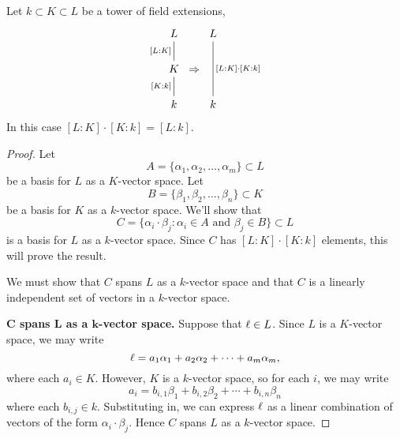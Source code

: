 \documentclass{ximera}
\begin{document}
\begin{lemma}\label{L:dm}
  Let $k\subset K\subset L$ be a tower of field extensions,
  \[
  \begin{tikzcd}[column sep=0pt]
    L\ar[d,-,"{[L:K]}",swap]  &             &  L\ar[dd,-,"{[L:K]\cdot [K:k]}"]   \\
    K \ar[d,-,"{[K:k]}",swap] & \Rightarrow &     \\
    k                         &             &  k
  \end{tikzcd}
  \]
  In this case $[L:K]\cdot [K:k] = [L:k]$.
  \begin{proof}
    Let
    \[
    A = \{\alpha_1,\alpha_2,\dots,\alpha_m\}\subset L
    \]
    be a basis for $L$ as a $K$-vector space. Let
    \[
    B = \{\beta_1,\beta_2,\dots,\beta_n\}\subset K
    \]
    be a basis for $K$ as a $k$-vector space. We'll show that
    \[
    C = \{\alpha_i\cdot \beta_j:\alpha_i\in A \text{ and }\beta_j\in B\} \subset L
    \]
    is a basis for $L$ as a $k$-vector space. Since $C$ has
    $[L:K]\cdot [K:k]$ elements, this will prove the result.

    We must show that $C$ spans $L$ as a $k$-vector space and that $C$
    is a linearly independent set of vectors in a $k$-vector space.

    \textbf{$\boldsymbol C$ spans $\boldsymbol L$ as a $\boldsymbol k$-vector space.} Suppose
    that $\ell\in L$. Since $L$ is a $K$-vector space, we may write
    \[
    \ell = a_1\alpha_1 + a_2 \alpha_2 + \cdots + a_m\alpha_m,
    \]
    where each $a_i\in K$. However, $K$ is a $k$-vector space, so for
    each $i$, we may write
    \[
    a_i = b_{i,1}\beta_1 +  b_{i,2}\beta_2 + \cdots +   b_{i,n}\beta_n
    \]
    where each $b_{i,j}\in k$. Substituting in, we can express $\ell$ as
    a linear combination of vectors of the form $\alpha_i\cdot
    \beta_j$. Hence $C$ spans $L$ as a $k$-vector space.




\end{proof}
\end{lemma}
\end{document}
